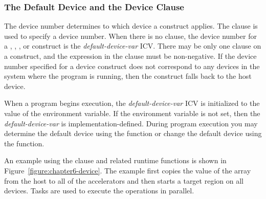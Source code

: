 \subsubsection{The Default Device and the Device Clause}
\label{ssec:06.device-clause}

The device number determines to which device a construct applies.  The
 clause is used to specify a device number.  When there is no
 clause, the device number for a , , ,  or  construct is the \emph{default-device-var} ICV.  There may be only one
 clause on a construct, and the expression in the clause must be
non-negative.  If the device number specified for a device construct does not
correspond to any devices in the system where the program is running, then the
construct falls back to the host device.

When a program begins execution, the \emph{default-device-var} ICV is
initialized to the value of the  environment variable.
If the environment variable is not set, then the \emph{default-device-var} is
implementation-defined.  During program execution you may determine the default
device using the  function or change the default
device using the  function.

An example using the  clause and related runtime functions is
shown in Figure~\ref{figure:chapter6-device}. The example first copies the value of the
array  from the host to all of the accelerators and then starts a
target region on all devices.  Tasks are used to
execute the operations in parallel.

